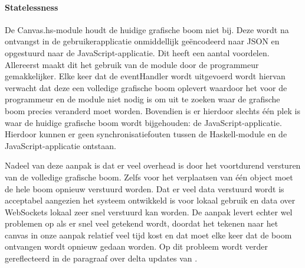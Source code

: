 \paragraph{Statelessness} \label{par:statelessness}
De Canvas.hs-module houdt de huidige grafische boom niet bij. Deze wordt na ontvangst in de gebruikerapplicatie onmiddellijk geëncodeerd naar JSON en opgestuurd naar de JavaScript-applicatie. Dit heeft een aantal voordelen. Allereerst maakt dit het gebruik van de module door de programmeur gemakkelijker. Elke keer dat de eventHandler wordt uitgevoerd wordt hiervan verwacht dat deze een volledige grafische boom oplevert waardoor het voor de programmeur en de module niet nodig is om uit te zoeken waar de grafische boom precies veranderd moet worden. Bovendien is er hierdoor slechts één plek is waar de huidige grafische boom wordt bijgehouden: de JavaScript-applicatie. Hierdoor kunnen er geen synchronisatiefouten tussen de Haskell-module en de JavaScript-applicatie ontstaan. 

Nadeel van deze aanpak is dat er veel overhead is door het voortdurend versturen van de volledige grafische boom. Zelfs voor het verplaatsen van één object moet de hele boom opnieuw verstuurd worden. Dat er veel data verstuurd wordt is acceptabel aangezien het systeem ontwikkeld is voor lokaal gebruik en data over WebSockets lokaal zeer snel verstuurd kan worden. De aanpak levert echter wel problemen op als er snel veel getekend wordt, doordat het tekenen naar het canvas in onze aanpak relatief veel tijd kost en dat moet elke keer dat de boom ontvangen wordt opnieuw gedaan worden. Op dit probleem wordt verder gereflecteerd in de paragraaf over delta updates van .

